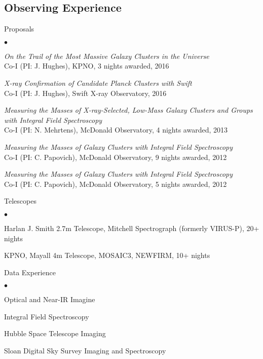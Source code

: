 \documentclass[margin,line, 11pt]{res}
\newenvironment{list2}{
  \begin{list}{$\bullet$}{%
      \setlength{\itemsep}{0in}
      \setlength{\parsep}{0in} \setlength{\parskip}{0in}
      \setlength{\topsep}{0in} \setlength{\partopsep}{0in}
      \setlength{\leftmargin}{0.2in}}}{\end{list}}
\begin{document}
\begin{resume}
\section{\sc Observing Experience}
Proposals
    \begin{list2}
        \vspace*{.05in}
    \item \emph{On the Trail of the Most Massive Galaxy Clusters in the Universe}\\
    Co-I (PI: J. Hughes), KPNO, 3 nights awarded, 2016
    \item \emph{X-ray Confirmation of Candidate Planck Clusters with Swift}\\
    Co-I (PI: J. Hughes), Swift X-ray Observatory, 2016
    \item \emph{Measuring the Masses of X-ray-Selected, Low-Mass Galaxy Clusters and Groups with Integral Field Spectroscopy}\\
		Co-I (PI: N. Mehrtens), McDonald Observatory, 4 nights awarded, 2013
    \item \emph{Measuring the Masses of Galaxy Clusters with Integral Field Spectroscopy}\\
		Co-I (PI: C. Papovich), McDonald Observatory, 9 nights awarded, 2012
    \item \emph{Measuring the Masses of Galaxy Clusters with Integral Field Spectroscopy}\\
		Co-I (PI: C. Papovich), McDonald Observatory, 5 nights awarded, 2012
	\end{list2}
Telescopes
    \begin{list2}
        \vspace*{.05in}
    \item Harlan J. Smith 2.7m Telescope, Mitchell Spectrograph (formerly VIRUS-P), 20+ nights
    \item KPNO, Mayall 4m Telescope, MOSAIC3, NEWFIRM, 10+ nights
	\end{list2}
Data Experience
    \begin{list2}
        \vspace*{.05in}
    \item Optical and Near-IR Imagine
		\item Integral Field Spectroscopy
    \item Hubble Space Telescope Imaging
		\item Sloan Digital Sky Survey Imaging and Spectroscopy
	\end{list2}


\end{resume}
\end{document}
